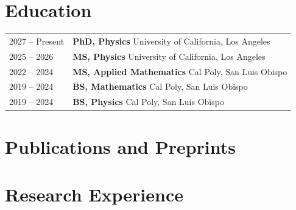 \documentclass[a4paper,11pt]{article}
\newcommand{\calpoly}{\textcolor{black!55!white}{Cal Poly, San Luis Obispo}}
\newcommand{\ucla}{\textcolor{black!55!white}{University of California, Los Angeles}}
\begin{document}
\section{Education}
\begin{tabularx}{\linewidth}{@{}l X@{}}
2027 -- Present & \textbf{PhD, Physics} \hfill\ucla \\

2025 -- 2026 & \textbf{MS, Physics} \hfill\ucla\\

2022 -- 2024 & \textbf{MS, Applied Mathematics} \hfill\calpoly\\

2019 -- 2024 & \textbf{BS, Mathematics} \hfill\calpoly\\

2019 -- 2024 & \textbf{BS, Physics} \hfill\calpoly\\
\end{tabularx}

\section{Publications and Preprints}\label{sec:publications}
\begin{refsection}
\nocite{*}
\printbibliography[heading=none]
\end{refsection}

\section{Research Experience} %
\end{document}
